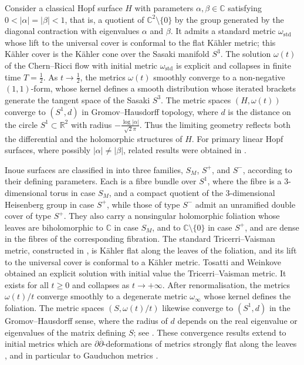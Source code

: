 \documentclass[12pt]{amsart}
\numberwithin{equation}{section}
\theoremstyle{remark}
\theoremstyle{definition}
\begin{document}
Consider a classical Hopf surface $H$ with parameters $\alpha,\beta\in\mathbb C$ satisfying $0<|\alpha|=|\beta|<1$, that is, a quotient of $\mathbb C^2\setminus\{0\}$ by the group generated by the diagonal contraction with eigenvalues $\alpha$ and $\beta$. It admits a standard metric $\omega_{\text{std}}$ whose lift to the universal cover is conformal to the flat K\"ahler metric; this K\"ahler cover is the K\"ahler cone over the Sasaki manifold $S^3$. The solution $\omega(t)$ of the Chern--Ricci flow with initial metric $\omega_{\text{std}}$ is explicit and collapses in finite time $T=\tfrac12$. As $t\to\tfrac12$, the metrics $\omega(t)$ smoothly converge to a non-negative $(1,1)$-form, whose kernel defines a smooth distribution whose iterated brackets generate the tangent space of the Sasaki $S^3$.
The metric spaces $(H, \omega(t))$ converge to $(S^1,d)$ in Gromov--Hausdorff topology, where $d$ is the distance on the circle $S^1\subset \mathbb R^2$ with radius $-\frac{\log|\alpha|}{\sqrt{2}\pi}$.
Thus the limiting geometry reflects both the differential and the holomorphic structures of $H$.
For primary linear Hopf surfaces, where possibly $|\alpha|\neq|\beta|$, related results were obtained in \cite{edwards}.

Inoue surfaces are classified in \cite{inoue} into three families, $S_M$, $S^+$, and $S^-$, according to their defining parameters.
Each is a fibre bundle over $S^1$, where the fibre is a $3$-dimensional torus in case $S_M$, and a compact quotient of the $3$-dimensional Heisenberg group in case $S^+$, while those of type $S^-$ admit an unramified double cover of type $S^+$.
They also carry a nonsingular holomorphic foliation whose leaves are biholomorphic to $\mathbb C$ in case $S_M$, and to $\mathbb C\setminus\{0\}$ in case $S^+$, and are dense in the fibres of the corresponding fibration.
The standard Tricerri--Vaisman metric, constructed in \cite{tricerri, vaisman}, is K\"ahler flat along the leaves of the foliation, and its lift to the universal cover is conformal to a K\"ahler metric.
Tosatti and Weinkove \cite{tosatti-weinkove-2} obtained an explicit solution with initial value the Tricerri--Vaisman metric. It exists for all $t\geq0$ and collapses as $t\to+\infty$. After renormalisation, the metrics $\omega(t)/t$ converge smoothly to a degenerate metric $\omega_\infty$ whose kernel defines the foliation. The metric spaces $(S, \omega(t)/t)$ likewise converge to $(S^1,d)$ in the Gromov--Hausdorff sense, where the radius of $d$ depends on the real eigenvalue or eigenvalues of the matrix defining $S$; see \cite[Section 5]{tosatti-weinkove-2}.
These convergence results extend to initial metrics which are $\partial\overline\partial$-deformations of metrics strongly flat along the leaves \cite{fang-tosatti-weinkove-zheng}, and in particular to Gauduchon metrics \cite{angella-tosatti}.
\end{document}
